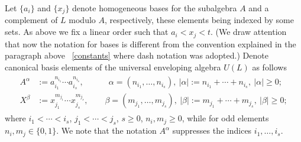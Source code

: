 \documentclass[12pt, reqno]{amsart}
\theoremstyle{remark}
\theoremstyle{definition}
\numberwithin{equation}{section}
\begin{document}
Let $\{a_i\}$ and $\{x_j\}$ denote homogeneous bases for the subalgebra $A$ and a complement of $L$ modulo $A$, respectively,
these elements being indexed by some sets. 
As above we fix a linear order such that $a_i<x_j<t$.
(We draw attention that now  the notation for bases is different from the convention explained in  the paragraph above ~\eqref{constants} where dash notation was adopted.)
Denote canonical basis elements of the universal enveloping algebra $U(L)$ as follows
\begin{align}\label{AX}
\begin{split}
A^{\alpha}&:=a_{i_1}^{n_{i_1}}\cdots a_{i_s}^{n_{i_s}},\quad \qquad 
{ \alpha = (n_{i_1}, \ldots, n_{i_s} ),\  | \alpha |:=n_{i_1}+\cdots+n_{i_s} ,\ | \alpha |\ge 0;}  \\    
X^{\beta}&:=x_{j_1}^{m_{j_1}}\cdots x_{j_s}^{m_{j_s}}, \qquad 
{ \beta = (m_{j_1}, \ldots, m_{j_s}),\
| \beta|:=m_{j_1}+\cdots+m_{j_s},\ | \beta |\ge 0;}   
\end{split}
\end{align}
where $i_1<\cdots <i_s$, $j_1<\cdots <j_s$, $s\ge 0$,  $n_i,m_j\ge 0$, while for odd elements  $n_i,m_j\in\{0,1\}$. 
We note that the notation $A^{\alpha}$ suppresses the indices $i_1, \ldots, i_s$.
\end{document}
